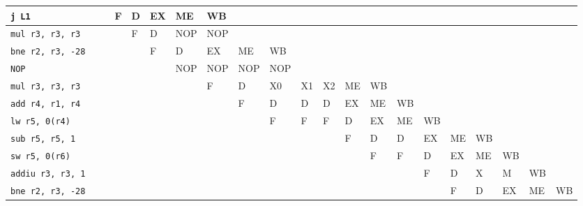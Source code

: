 \documentclass[a4paper,11pt]{article}
\begin{document}
{\begin{landscape}
\begin{table}
\begin{center}
\begin{tabular}{| l | l | l | l | l | l | l | l | l | l | l | l | l | l | l | l | l | l | l | l | l |}
\texttt{j L1}              &     &     & F   & D   & EX  & ME  & WB  &     &     &     &     &      &      &      &      &      &      &      &      &     \\ \hline
\texttt{mul r3, r3, r3}    &     &     &     & F   & D   & NOP & NOP &     &     &     &     &      &      &      &      &      &      &      &      &     \\ \hline
\texttt{bne r2, r3, -28}   &     &     &     &     & F   & D   & EX  &  ME & WB  &     &     &      &      &      &      &      &      &      &      &     \\ \hline
\texttt{NOP}               &     &     &     &     &     & NOP & NOP & NOP & NOP &     &     &      &      &      &      &      &      &      &      &     \\ \hline
\texttt{mul r3, r3, r3}    &     &     &     &     &     &     & F   & D   & X0  & X1  & X2  & ME   & WB   &      &      &      &      &      &      &     \\ \hline
\texttt{add r4, r1, r4}    &     &     &     &     &     &     &     & F   & D   & D   & D   & EX   & ME   & WB   &      &      &      &      &      &     \\ \hline
\texttt{lw r5, 0(r4)}      &     &     &     &     &     &     &     &     & F   & F   & F   & D    & EX   & ME   & WB   &      &      &      &      &     \\ \hline
\texttt{sub r5, r5, 1}     &     &     &     &     &     &     &     &     &     &     &     & F    & D    & D    & EX   &  ME  &  WB  &      &      &     \\ \hline
\texttt{sw r5, 0(r6)}      &     &     &     &     &     &     &     &     &     &     &     &      & F    & F    & D    &  EX  &  ME  &  WB  &      &     \\ \hline
\texttt{addiu r3, r3, 1}   &     &     &     &     &     &     &     &     &     &     &     &      &      &      & F    &  D   &  X   &  M   & WB   &     \\ \hline
\texttt{bne r2, r3, -28}   &     &     &     &     &     &     &     &     &     &     &     &      &      &      &      & F    &  D   &  EX  &  ME  & WB  \\ \hline
  \end{tabular}
  \end{center}
  \end{table}
  \end{landscape}
  \clearpage%
}
\end{document}
